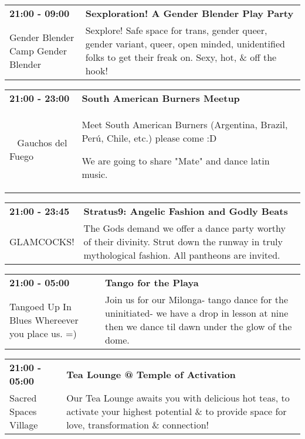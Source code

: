 \begin{tabular}{ p{1in} p{2.2in} }
    \textbf{21:00 - 09:00} & \textbf{ Sexploration! A Gender Blender Play Party} \\
    Gender Blender \newline Camp Gender Blender & Sexplore! Safe space for trans, gender queer, gender variant, queer, open minded, unidentified folks to get their freak on. Sexy, hot, \& off the hook! \\
    \hline 
\end{tabular}
    
\begin{tabular}{ p{1in} p{2.2in} }
    \textbf{21:00 - 23:00} & \textbf{South American Burners Meetup} \\
    ~ \newline Gauchos del Fuego & Meet South American Burners (Argentina, Brazil, Per\'u, Chile, etc.) please come :D

We are going to share "Mate" and dance latin music. \\
    \hline 
\end{tabular}
    
\begin{tabular}{ p{1in} p{2.2in} }
    \textbf{21:00 - 23:45} & \textbf{Stratus9: Angelic Fashion and Godly Beats} \\
    GLAMCOCKS! \newline  & The Gods demand we offer a dance party worthy of their divinity. Strut down the runway in truly mythological fashion. All pantheons are invited. \\
    \hline 
\end{tabular}
    
\begin{tabular}{ p{1in} p{2.2in} }
    \textbf{21:00 - 05:00} & \textbf{Tango for the Playa} \\
    Tangoed Up In Blues \newline Whereever you place us. =) & Join us for our Milonga- tango dance for the uninitiated- we have a drop in lesson at nine then we dance til dawn under the glow of the dome. \\
    \hline 
\end{tabular}
    
\begin{tabular}{ p{1in} p{2.2in} }
    \textbf{21:00 - 05:00} & \textbf{Tea Lounge @ Temple of Activation } \\
    Sacred Spaces Village \newline  & Our Tea Lounge awaits you with delicious hot teas, to activate your highest potential \& to provide space for love, transformation \& connection! \\
    \hline 
\end{tabular}
    
